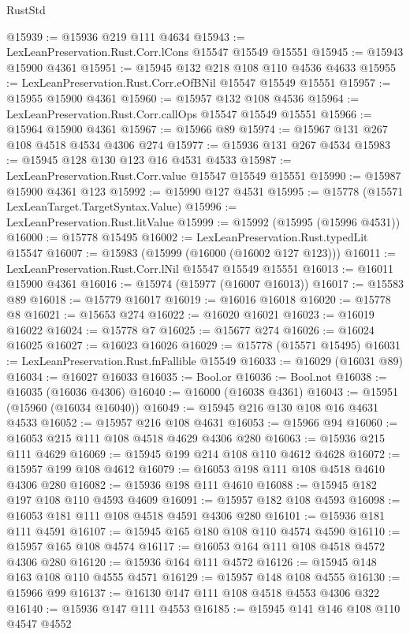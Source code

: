 \begin{lexlean}{RustStd}
\begin{coremodule}
{\begin{coremodule}
{{{{{{{{{{{{{{{{{{{{{{{{{{{{{{{{{{{{{{{{{{{{{{{{{{{{{{{{{{{{@15939 := @15936 @219 @111 @4634
@15943 := LexLeanPreservation.Rust.Corr.lCons @15547 @15549 @15551
@15945 := @15943 @15900 @4361
@15951 := @15945 @132 @218 @108 @110 @4536 @4633
@15955 := LexLeanPreservation.Rust.Corr.eOfBNil @15547 @15549 @15551
@15957 := @15955 @15900 @4361
@15960 := @15957 @132 @108 @4536
@15964 := LexLeanPreservation.Rust.Corr.callOps @15547 @15549 @15551
@15966 := @15964 @15900 @4361
@15967 := @15966 @89
@15974 := @15967 @131 @267 @108 @4518 @4534 @4306 @274
@15977 := @15936 @131 @267 @4534
@15983 := @15945 @128 @130 @123 @16 @4531 @4533
@15987 := LexLeanPreservation.Rust.Corr.value @15547 @15549 @15551
@15990 := @15987 @15900 @4361 @123
@15992 := @15990 @127 @4531
@15995 := @15778 (@15571 LexLeanTarget.TargetSyntax.Value)
@15996 := LexLeanPreservation.Rust.litValue
@15999 := @15992 (@15995 (@15996 @4531))
@16000 := @15778 @15495
@16002 := LexLeanPreservation.Rust.typedLit @15547
@16007 := @15983 (@15999 (@16000 (@16002 @127 @123)))
@16011 := LexLeanPreservation.Rust.Corr.lNil @15547 @15549 @15551
@16013 := @16011 @15900 @4361
@16016 := @15974 (@15977 (@16007 @16013))
@16017 := @15583 @89
@16018 := @15779 @16017
@16019 := @16016 @16018
@16020 := @15778 @8
@16021 := @15653 @274
@16022 := @16020 @16021
@16023 := @16019 @16022
@16024 := @15778 @7
@16025 := @15677 @274
@16026 := @16024 @16025
@16027 := @16023 @16026
@16029 := @15778 (@15571 @15495)
@16031 := LexLeanPreservation.Rust.fnFallible @15549
@16033 := @16029 (@16031 @89)
@16034 := @16027 @16033
@16035 := Bool.or
@16036 := Bool.not
@16038 := @16035 (@16036 @4306)
@16040 := @16000 (@16038 @4361)
@16043 := @15951 (@15960 (@16034 @16040))
@16049 := @15945 @216 @130 @108 @16 @4631 @4533
@16052 := @15957 @216 @108 @4631
@16053 := @15966 @94
@16060 := @16053 @215 @111 @108 @4518 @4629 @4306 @280
@16063 := @15936 @215 @111 @4629
@16069 := @15945 @199 @214 @108 @110 @4612 @4628
@16072 := @15957 @199 @108 @4612
@16079 := @16053 @198 @111 @108 @4518 @4610 @4306 @280
@16082 := @15936 @198 @111 @4610
@16088 := @15945 @182 @197 @108 @110 @4593 @4609
@16091 := @15957 @182 @108 @4593
@16098 := @16053 @181 @111 @108 @4518 @4591 @4306 @280
@16101 := @15936 @181 @111 @4591
@16107 := @15945 @165 @180 @108 @110 @4574 @4590
@16110 := @15957 @165 @108 @4574
@16117 := @16053 @164 @111 @108 @4518 @4572 @4306 @280
@16120 := @15936 @164 @111 @4572
@16126 := @15945 @148 @163 @108 @110 @4555 @4571
@16129 := @15957 @148 @108 @4555
@16130 := @15966 @99
@16137 := @16130 @147 @111 @108 @4518 @4553 @4306 @322
@16140 := @15936 @147 @111 @4553
@16185 := @15945
    @141
    @146
    @108
    @110
    @4547
    @4552
}}}}}}}}}}}}}}}}}}}}}}}}}}}}}}}}}}}}}}}}}}}}}}}}}}}}}}}}}}}}
\end{coremodule}}
\end{coremodule}
\end{lexlean}
